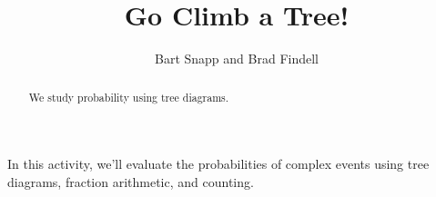 \documentclass[nooutcomes]{ximera}
\title{Go Climb a Tree!}
\author{Bart Snapp and Brad Findell}
\begin{document}
\begin{abstract}
  We study probability using tree diagrams.
\end{abstract}
\maketitle



In this activity, we'll evaluate the probabilities of complex events
using tree diagrams, fraction arithmetic, and counting.

%
%

%
\end{document}
